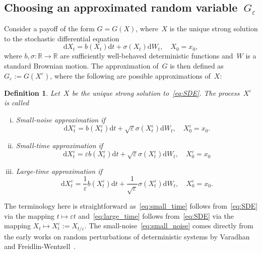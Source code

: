 \documentclass{amsart}[11pt]
\numberwithin{equation}{section}
\numberwithin{theorem}{subsection}
\numberwithin{proposition}{subsection}
\newtheorem{definition}{Definition}
\numberwithin{definition}{subsection}
\numberwithin{lemma}{subsection}
\numberwithin{assumption}{subsection}
\newcommand{\RR}{\mathbb{R}}
\newcommand{\D}{\mathrm{d}}
\newcommand{\eps}{\varepsilon}
\begin{document}
\subsection{Choosing an approximated random variable~$G_{\eps}$}\label{sec:Proxies}
Consider a payoff of the form $G = G(X)$, where~$X$ is
the unique strong solution to the stochastic differential equation
\begin{equation}\label{eq:SDE}
\D X_t = b(X_t) \D t + \sigma(X_t) \D W_t, \quad X_0 = x_0,
\end{equation}
where $b,\sigma:\RR\rightarrow \RR$ are sufficiently well-behaved
deterministic functions and~$W$ is a standard Brownian motion. 
The approximation of~$G$ is then defined as  $G_{\eps}:=G(X^{\eps})$, 
where the following are possible approximations of~$X$:
\begin{definition}
Let~$X$ be the unique strong solution to~\eqref{eq:SDE}.
The process~$X^\eps$ is called
\begin{enumerate}[i)]
\item Small-noise approximation if 
\begin{equation}\label{eq:small_noise}
\D X_t^\eps = b(X_t^\eps) \D t + \sqrt{\eps} \sigma(X_t^\eps)\D W_t, \quad X_0^\eps = x_0.
\end{equation}

\item Small-time approximation if 
\begin{equation}\label{eq:small_time}
\D X_t^\eps = \eps b(X_t^\eps) \D t + \sqrt{\eps} \sigma(X_t^\eps) \D W_t, \quad X_0^\eps = x_0
\end{equation}
\item Large-time approximation if 
\begin{equation}\label{eq:large_time}
\D X_t^\eps = \frac{1}{\eps} b(X_t^\eps) \D t + \frac{1}{\sqrt{\eps}} \sigma(X_t^\eps) \D W_t, \quad X_0^\eps = x_0.
\end{equation}
\end{enumerate}
\end{definition}
The terminology here is straightforward as~\eqref{eq:small_time} follows from~\eqref{eq:SDE} via the mapping $t \mapsto \eps t$
and~\eqref{eq:large_time} follows from~\eqref{eq:SDE} via the mapping
$X_t \mapsto X_t^\eps:=X_{t/\eps}$.
The small-noise~\eqref{eq:small_noise}
comes directly from the early works 
on random perturbations of deterministic systems by Varadhan~\cite{Varadhan1967} and Freidlin-Wentzell~\cite{Freidlin2012}.
\end{document}
